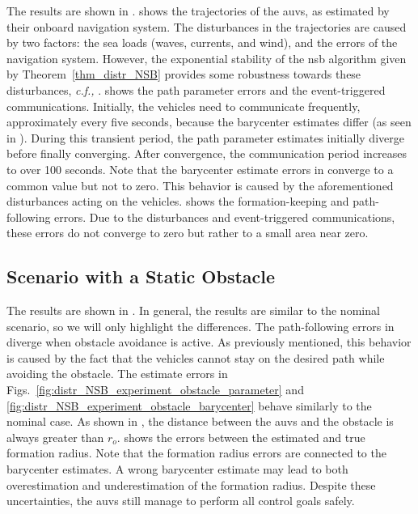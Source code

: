The results are shown in .
 shows the trajectories of the \glspl{auv}, as estimated by their onboard navigation system.
The disturbances in the trajectories are caused by two factors: the sea loads (waves, currents, and wind), and the errors of the navigation system.
However, the exponential stability of the \gls{nsb} algorithm given by Theorem~\ref{thm_distr_NSB} provides some robustness towards these disturbances, \emph{c.f.,} \cite[Lemma 9.2]{khalil_nonlinear_2002}.
 shows the path parameter errors and the event-triggered communications.
Initially, the vehicles need to communicate frequently, approximately every five seconds, because the barycenter estimates differ (as seen in ).
During this transient period, the path parameter estimates initially diverge before finally converging.
After convergence, the communication period increases to over 100 seconds.
Note that the barycenter estimate errors in  converge to a common value but not to zero.
This behavior is caused by the aforementioned disturbances acting on the vehicles.
 shows the formation-keeping and path-following errors.
Due to the disturbances and event-triggered communications, these errors do not converge to zero but rather to a small area near zero.

\subsection{Scenario with a Static Obstacle}


The results are shown in .
In general, the results are similar to the nominal scenario, so we will only highlight the differences.
The path-following errors in  diverge when obstacle avoidance is active.
As previously mentioned, this behavior is caused by the fact that the vehicles cannot stay on the desired path while avoiding the obstacle.
The estimate errors in Figs.~\ref{fig:distr_NSB_experiment_obstacle_parameter} and \ref{fig:distr_NSB_experiment_obstacle_barycenter} behave similarly to the nominal case.
As shown in , the distance between the \glspl{auv} and the obstacle is always greater than $r_o$.
 shows the errors between the estimated and true formation radius.
Note that the formation radius errors are connected to the barycenter estimates.
A wrong barycenter estimate may lead to both overestimation and underestimation of the formation radius.
Despite these uncertainties, the \glspl{auv} still manage to perform all control goals safely.
